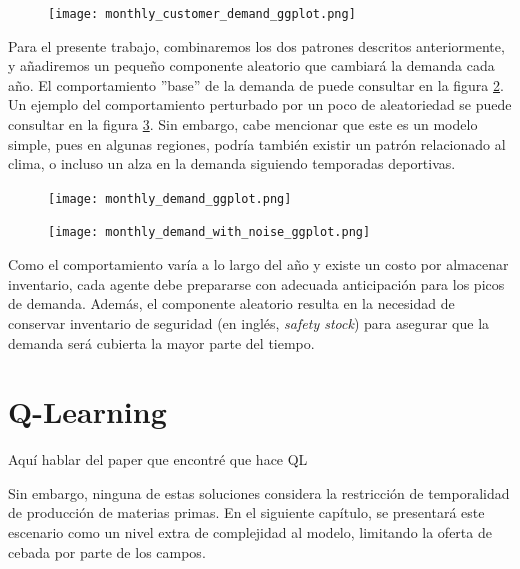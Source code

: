 \begin{figure}[ht!]
\caption{ }
\label{weekly_base}
\texttt{[image: monthly\_customer\_demand\_ggplot.png]}
\centering
\end{figure}

Para el presente trabajo, combinaremos los dos patrones descritos anteriormente, y a\~nadiremos un peque\~no componente aleatorio que cambiar\'a la demanda cada a\~no. El comportamiento ''base'' de la demanda de puede consultar en la figura \ref{yearly_base}. Un ejemplo del comportamiento perturbado por un poco de aleatoriedad se puede consultar en la figura \ref{yearly_base_noisy}. Sin embargo, cabe mencionar que este es un modelo simple, pues en algunas regiones, podr\'ia tambi\'en existir un patr\'on relacionado al clima, o incluso un alza en la demanda siguiendo temporadas deportivas. \\

\begin{figure}[ht!]
\caption{ }
\label{yearly_base}
\texttt{[image: monthly\_demand\_ggplot.png]}
\centering
\end{figure}

\begin{figure}[ht!]
\caption{ }
\label{yearly_base_noisy}
\texttt{[image: monthly\_demand\_with\_noise\_ggplot.png]}
\centering
\end{figure}

Como el comportamiento var\'ia a lo largo del a\~no y existe un costo por almacenar inventario, cada agente debe prepararse con adecuada anticipaci\'on para los picos de demanda. Adem\'as, el componente aleatorio resulta en la necesidad de conservar inventario de seguridad (en ingl\'es, \textit{safety stock}) para asegurar que la demanda ser\'a cubierta la mayor parte del tiempo.

\section{Q-Learning}
Aqu\'i hablar del paper que encontr\'e que hace QL \citet{Chaharsooghi}

Sin embargo, ninguna de estas soluciones considera la restricción de temporalidad de producci\'on de materias primas. En el siguiente cap\'itulo, se presentar\'a este escenario como un nivel extra de complejidad al modelo, limitando la oferta de cebada por parte de los campos.